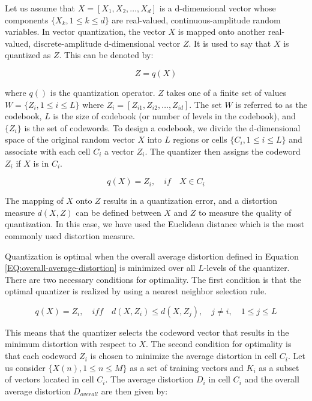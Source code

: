 \documentclass{article}[14pt, oneside, a4paper, times]
\begin{document}
Let us assume that $X=[X_1, X_2, \ldots, X_d]$ is a d-dimensional vector whose components $\{X_k, 1 \leq k \leq d\}$ are real-valued, continuous-amplitude random variables. In vector quantization, the vector $X$ is mapped onto another real-valued, discrete-amplitude d-dimensional vector $Z$. It is used to say that $X$ is quantized as $Z$. This can be denoted by:

\begin{equation}
    Z=q(X)
\end{equation}

\noindent where $q()$ is the quantization operator. $Z$ takes one of a finite set of values $W=\{Z_i, 1 \leq i \leq L\}$ where $Z_i=[Z_{i1},Z_{i2}, \ldots, Z_{id}]$. The set $W$ is referred to as the codebook, $L$ is the size of codebook (or number of levels in the codebook), and $\{Z_i\}$ is the set of codewords. To design a codebook, we divide the d-dimensional space of the original random vector $X$ into $L$ regions or cells $\{C_i, 1 \leq i \leq L\}$ and associate with each cell $C_i$ a vector $Z_i$. The quantizer then assigns the codeword $Z_i$ if $X$ is in $C_i$.

\begin{equation}
    q(X)=Z_i, \quad if \quad X \in C_i
\end{equation}

The mapping of $X$ onto $Z$ results in a quantization error, and a distortion measure $d(X,Z)$ can be defined between $X$ and $Z$ to measure the quality of quantization. In this case, we have used the Euclidean distance which is the most commonly used distortion measure.

Quantization is optimal when the overall average distortion defined in Equation \ref{EQ:overall-average-distortion} is minimized over all $L$-levels of the quantizer. There are two necessary conditions for optimality. The first condition is that the optimal quantizer is realized by using a nearest neighbor selection rule.

\begin{equation}
    q(X) = Z_i,     \quad iff \quad d(X,Z_i) \leq d(X,Z_j),
                    \quad j \neq i,
                    \quad 1 \leq j \leq L
\end{equation}

This means that the quantizer selects the codeword vector that results in the minimum distortion with respect to $X$. The second condition for optimality is that each codeword $Z_i$ is chosen to minimize the average distortion in cell $C_i$. Let us consider $\{X(n), 1 \leq n \leq M\}$ as a set of training vectors and $K_i$ as a subset of vectors located in cell $C_i$. The average distortion $D_i$ in cell $C_i$ and the overall average distortion $D_{overall}$ are then given by:
\end{document}
